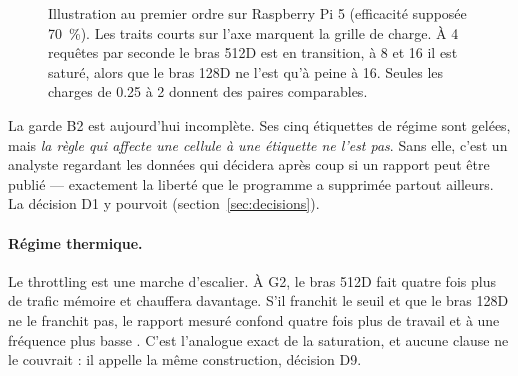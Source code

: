\documentclass[11pt,a4paper]{article}
\begin{document}
\begin{figure}[h]
\centering
{}
\caption{Illustration au premier ordre sur Raspberry Pi 5 (efficacité supposée
\SI{70}{\percent}). Les traits courts sur l'axe marquent la grille de charge. À 4
requêtes par seconde le bras 512D est en transition, à 8 et 16 il est saturé, alors
que le bras 128D ne l'est qu'à peine à 16. Seules les charges de \num{0,25} à 2
donnent des paires comparables.}
\label{fig:regimes}
\end{figure}

La garde B2 est aujourd'hui incomplète. Ses cinq étiquettes de régime sont gelées,
mais \emph{la règle qui affecte une cellule à une étiquette ne l'est pas}. Sans elle,
c'est un analyste regardant les données qui décidera après coup si un rapport peut
être publié — exactement la liberté que le programme a supprimée partout ailleurs.
La décision D1 y pourvoit (section~\ref{sec:decisions}).

\paragraph{Régime thermique.} Le throttling est une marche d'escalier. À G2, le bras
512D fait quatre fois plus de trafic mémoire et chauffera davantage. S'il franchit
le seuil et que le bras 128D ne le franchit pas, le rapport mesuré confond
\og quatre fois plus de travail \fg{} et \og à une fréquence plus basse \fg. C'est
l'analogue exact de la saturation, et aucune clause ne le couvrait : il appelle la
même construction, décision D9.
\end{document}
